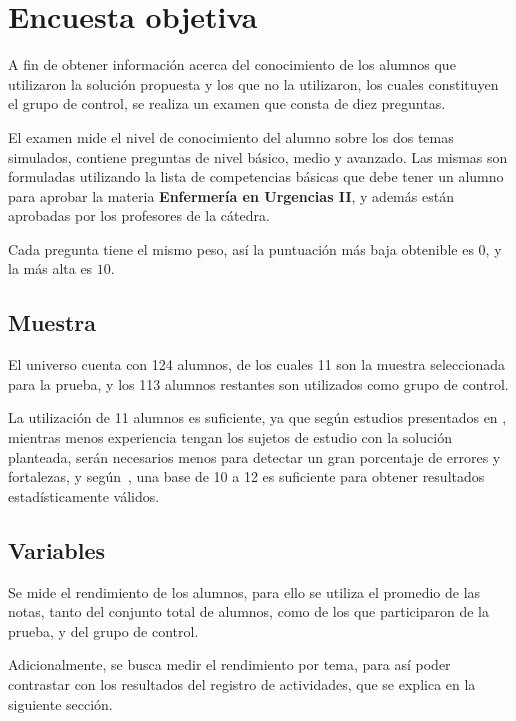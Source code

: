 \section{Encuesta objetiva}
\label{sec:objetiva}

A fin de obtener información acerca del conocimiento de los alumnos que
utilizaron la solución propuesta y los que no la utilizaron, los cuales
constituyen el grupo de control, se realiza un examen que consta de diez
preguntas.

El examen mide el nivel de conocimiento del alumno sobre los dos temas
simulados, contiene preguntas de nivel básico, medio y avanzado. Las mismas son
formuladas utilizando la lista de competencias básicas que debe tener un alumno
para aprobar la materia \textbf{Enfermería en Urgencias II}, y además están
aprobadas por los profesores de la cátedra.

Cada pregunta tiene el mismo peso, así la puntuación más baja obtenible es $0$, y
la más alta es $10$.

\subsection{Muestra}

El universo cuenta con 124 alumnos, de los cuales 11 son la muestra seleccionada
para la prueba, y los 113 alumnos restantes son utilizados
como grupo de control.

La utilización de 11 alumnos es suficiente, ya que según estudios presentados en
\cite{nielsen2000}, mientras menos experiencia tengan los sujetos de estudio con
la solución planteada, serán necesarios menos para detectar un gran porcentaje
de errores y fortalezas, y según~\cite{ritch2009}, una base de 10 a 12 es
suficiente para obtener resultados estadísticamente válidos.

\subsection{Variables}


Se mide el rendimiento de los alumnos, para ello se utiliza el promedio de las
notas, tanto del conjunto total de alumnos, como de los que participaron de la
prueba, y del grupo de control.

Adicionalmente, se busca medir el rendimiento por tema, para así poder
contrastar con los resultados del registro de actividades, que se explica en la
siguiente sección.

